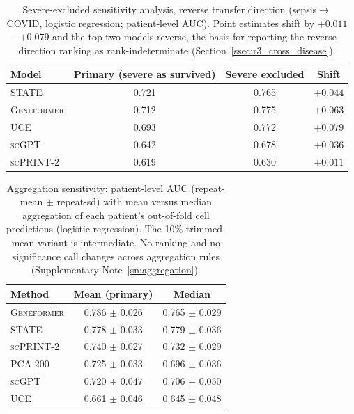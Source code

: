 \documentclass[11pt,a4paper]{article}
\newcommand{\model}[1]{\textsc{#1}}
\begin{document}
\begin{table}[t]
\centering
\caption{Severe-excluded sensitivity analysis, reverse transfer direction
(sepsis$\rightarrow$COVID, logistic regression; patient-level AUC). Point
estimates shift by $+0.011$--$+0.079$ and the top two models reverse, the
basis for reporting the reverse-direction ranking as rank-indeterminate
(Section~\ref{ssec:r3_cross_disease}).}
\label{tab:severe_sens}
\small
\begin{tabular}{lccc}
\toprule
\textbf{Model} & \textbf{Primary (severe as survived)} & \textbf{Severe excluded} & \textbf{Shift} \\
\midrule
\model{STATE} & 0.721 & 0.765 & $+0.044$ \\
\model{Geneformer} & 0.712 & 0.775 & $+0.063$ \\
\model{UCE} & 0.693 & 0.772 & $+0.079$ \\
\model{scGPT} & 0.642 & 0.678 & $+0.036$ \\
\model{scPRINT-2} & 0.619 & 0.630 & $+0.011$ \\
\bottomrule
\end{tabular}
\end{table}

\begin{table}[t]
\centering
\caption{Aggregation sensitivity: patient-level AUC (repeat-mean $\pm$
repeat-sd) with mean versus median aggregation of each patient's out-of-fold
cell predictions (logistic regression). The 10\% trimmed-mean variant is
intermediate. No ranking and no significance call changes across
aggregation rules (Supplementary Note~\ref{sn:aggregation}).}
\label{tab:aggregation_sens}
\small
\begin{tabular}{lcc}
\toprule
\textbf{Method} & \textbf{Mean (primary)} & \textbf{Median} \\
\midrule
\model{Geneformer} & 0.786 $\pm$ 0.026 & 0.765 $\pm$ 0.029 \\
\model{STATE} & 0.778 $\pm$ 0.033 & 0.779 $\pm$ 0.036 \\
\model{scPRINT-2} & 0.740 $\pm$ 0.027 & 0.732 $\pm$ 0.029 \\
PCA-200 & 0.725 $\pm$ 0.033 & 0.696 $\pm$ 0.036 \\
\model{scGPT} & 0.720 $\pm$ 0.047 & 0.706 $\pm$ 0.050 \\
\model{UCE} & 0.661 $\pm$ 0.046 & 0.645 $\pm$ 0.048 \\
\bottomrule
\end{tabular}
\end{table}
\end{document}

